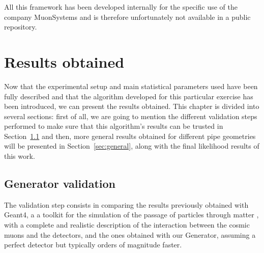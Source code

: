 \documentclass[a4paper, 11pt]{report}
\begin{document}
All this framework has been developed internally for the specific use of the company MuonSystems and is therefore unfortunately not available in a public repository.










































\chapter{Results obtained} \label{chapter:results}

Now that the experimental setup and main statistical parameters used have been fully described and that the algorithm developed for this particular exercise has been introduced, we can present the results obtained. This chapter is divided into several sections: first of all, we are going to mention the different validation steps performed to make sure that this algorithm's results can be trusted in Section~\ref{sec:validation} and then, more general results obtained for different pipe geometries will be presented in Section~\ref{sec:general}, along with the final likelihood results of this work.

\section{Generator validation} \label{sec:validation}

The validation step consists in comparing the results previously obtained with Geant4, a a toolkit for the simulation of the passage of particles through matter \cite{Geant4}, with a complete and realistic description of the interaction between the cosmic muons and the detectors, and the ones obtained with our Generator, assuming a perfect detector but typically orders of magnitude faster.
\end{document}
